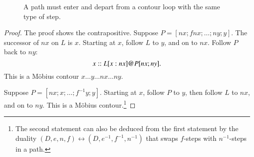 \begin{figure}[htb]
\centering
{}
\caption{A path must enter and depart from a contour loop with the
same type of step.}
\label{fig:interior_nf}
\end{figure}


\begin{proof} The proof shows the contrapositive.  Suppose $P=[n x;f n
x;\ldots;n y;y]$.  The successor of $n x$ on $L$ is $x$.  Starting
at $x$, follow $L$ to $y$, and on to $n x$.  Follow $P$ back to $n
y$:
\begin{displaymath}
x::L[x:n x] {{\operatorname{@}}} P[ n x;ny].
\end{displaymath}  
This is a M\"obius contour $x\ldots y\ldots n x\ldots n y$.

Suppose $P=[n x;x;\ldots;f^{-1} y;y]$.  Starting at $x$, follow $P$ to
$y$, then follow $L$ to $n x$, and on to $n y$.  This is a M\"obius
contour.\footnote{The second statement can also be deduced from the first statement
by the duality $(D,e,n,f)\leftrightarrow (D,e^{-1},f^{-1},n^{-1})$ that swaps
$f$-steps with $n^{-1}$-steps in a path.}
\end{proof}


%


